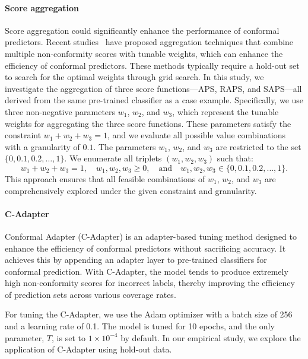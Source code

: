 \documentclass{article}
\newcommand{\1}{\mathbbm{1}}
\theoremstyle{plain}
\theoremstyle{definition}
\theoremstyle{remark}
\begin{document}
\paragraph{Score aggregation}   
Score aggregation could significantly enhance the performance of conformal predictors. Recent studies~\citep{yang2024selection, luo2024weighted, fan2024utopia, gasparin2024conformal, ge2024optimal, qin2024sat} have proposed aggregation techniques that combine multiple non-conformity scores with tunable weights, which can enhance the efficiency of conformal predictors. These methods typically require a hold-out set to search for the optimal weights through grid search. In this study, we investigate the aggregation of three score functions—APS, RAPS, and SAPS—all derived from the same pre-trained classifier as a case example. Specifically, we use three non-negative parameters $w_1$, $w_2$, and $w_3$, which represent the tunable weights for aggregating the three score functions. These parameters satisfy the constraint $w_1 + w_2 + w_3 = 1$, and we evaluate all possible value combinations with a granularity of $0.1$. The parameters $w_1$, $w_2$, and $w_3$ are restricted to the set $\{0, 0.1, 0.2, \dots, 1\}$. We enumerate all triplets $(w_1, w_2, w_3)$ such that:
\[
w_1 + w_2 + w_3 = 1, \quad w_1, w_2, w_3 \geq 0, \quad \text{and} \quad w_1, w_2, w_3 \in \{0, 0.1, 0.2, \dots, 1\}.
\]
This approach ensures that all feasible combinations of $w_1$, $w_2$, and $w_3$ are comprehensively explored under the given constraint and granularity.

\paragraph{C-Adapter} Conformal Adapter (C-Adapter) \cite{liu2025cadapter} is an adapter-based tuning method designed to enhance the efficiency of conformal predictors without sacrificing accuracy. It achieves this by appending an adapter layer to pre-trained classifiers for conformal prediction. With C-Adapter, the model tends to produce extremely high non-conformity scores for incorrect labels, thereby improving the efficiency of prediction sets across various coverage rates.

For tuning the C-Adapter, we use the Adam optimizer \cite{kingma2017adam} with a batch size of 256 and a learning rate of 0.1. The model is tuned for 10 epochs, and the only parameter, \( T \), is set to \( 1 \times 10^{-4} \) by default.  In our empirical study, we explore the application of C-Adapter using hold-out data.
\end{document}
